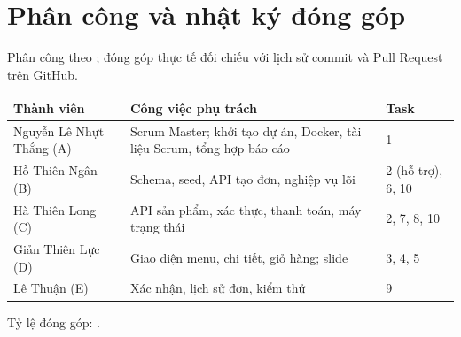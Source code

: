 \chapter{Phân công và nhật ký đóng góp}\label{app:phancong}
Phân công theo ; đóng góp thực tế đối chiếu với lịch sử commit và Pull Request trên GitHub.
\begin{longtable}{@{}p{3.4cm}p{6cm}p{3.6cm}@{}}
\toprule
\textbf{Thành viên} & \textbf{Công việc phụ trách} & \textbf{Task} \\ \midrule \endhead
Nguyễn Lê Nhựt Thắng (A) & Scrum Master; khởi tạo dự án, Docker, tài liệu Scrum, tổng hợp báo cáo & 1 \\
Hồ Thiên Ngân (B) & Schema, seed, API tạo đơn, nghiệp vụ lõi & 2 (hỗ trợ), 6, 10 \\
Hà Thiên Long (C) & API sản phẩm, xác thực, thanh toán, máy trạng thái & 2, 7, 8, 10 \\
Giản Thiên Lực (D) & Giao diện menu, chi tiết, giỏ hàng; slide & 3, 4, 5 \\
Lê Thuận (E) & Xác nhận, lịch sử đơn, kiểm thử & 9 \\
\bottomrule
\end{longtable}
Tỷ lệ đóng góp: .

